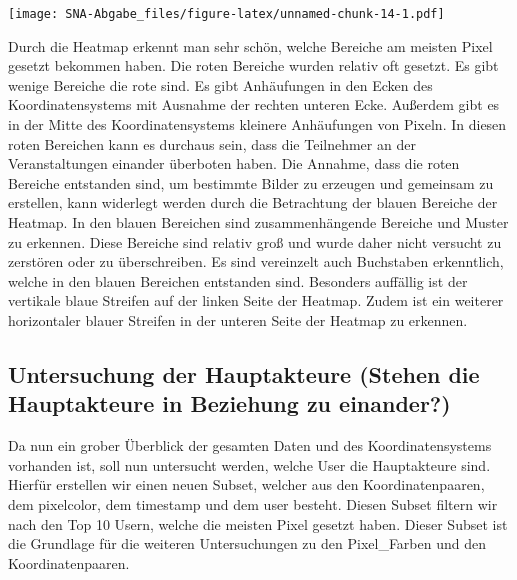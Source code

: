 \documentclass[
]{article}
\begin{document}
\texttt{[image: SNA-Abgabe\_files/figure-latex/unnamed-chunk-14-1.pdf]}

Durch die Heatmap erkennt man sehr schön, welche Bereiche am meisten
Pixel gesetzt bekommen haben. Die roten Bereiche wurden relativ oft
gesetzt. Es gibt wenige Bereiche die rote sind. Es gibt Anhäufungen in
den Ecken des Koordinatensystems mit Ausnahme der rechten unteren Ecke.
Außerdem gibt es in der Mitte des Koordinatensystems kleinere
Anhäufungen von Pixeln. In diesen roten Bereichen kann es durchaus sein,
dass die Teilnehmer an der Veranstaltungen einander überboten haben. Die
Annahme, dass die roten Bereiche entstanden sind, um bestimmte Bilder zu
erzeugen und gemeinsam zu erstellen, kann widerlegt werden durch die
Betrachtung der blauen Bereiche der Heatmap. In den blauen Bereichen
sind zusammenhängende Bereiche und Muster zu erkennen. Diese Bereiche
sind relativ groß und wurde daher nicht versucht zu zerstören oder zu
überschreiben. Es sind vereinzelt auch Buchstaben erkenntlich, welche in
den blauen Bereichen entstanden sind. Besonders auffällig ist der
vertikale blaue Streifen auf der linken Seite der Heatmap. Zudem ist ein
weiterer horizontaler blauer Streifen in der unteren Seite der Heatmap
zu erkennen.

\subsection{Untersuchung der Hauptakteure (Stehen die Hauptakteure in
Beziehung zu
einander?)}\label{untersuchung-der-hauptakteure-stehen-die-hauptakteure-in-beziehung-zu-einander}

Da nun ein grober Überblick der gesamten Daten und des
Koordinatensystems vorhanden ist, soll nun untersucht werden, welche
User die Hauptakteure sind. Hierfür erstellen wir einen neuen Subset,
welcher aus den Koordinatenpaaren, dem pixelcolor, dem timestamp und dem
user besteht. Diesen Subset filtern wir nach den Top 10 Usern, welche
die meisten Pixel gesetzt haben. Dieser Subset ist die Grundlage für die
weiteren Untersuchungen zu den Pixel\_Farben und den Koordinatenpaaren.
\end{document}
